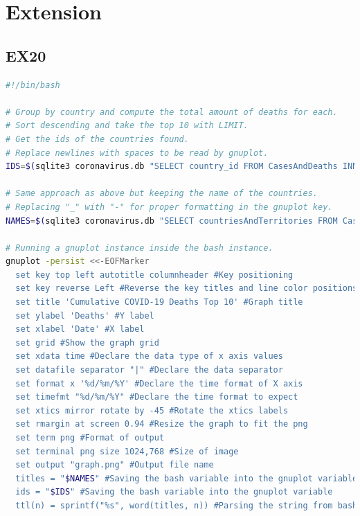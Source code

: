 \documentclass[12pt,oneside,a4paper,english]{article}
\begin{document}
\pagebreak
\section{Extension}
\subsection{EX20}

\begin{lstlisting}[language=Bash]
#!/bin/bash

# Group by country and compute the total amount of deaths for each.
# Sort descending and take the top 10 with LIMIT.
# Get the ids of the countries found.
# Replace newlines with spaces to be read by gnuplot.
IDS=$(sqlite3 coronavirus.db "SELECT country_id FROM CasesAndDeaths INNER JOIN Countries ON country_id=Countries.id GROUP BY country_id ORDER BY SUM(deaths) DESC LIMIT 10;" | tr '\n' ' ')

# Same approach as above but keeping the name of the countries.
# Replacing "_" with "-" for proper formatting in the gnuplot key.
NAMES=$(sqlite3 coronavirus.db "SELECT countriesAndTerritories FROM CasesAndDeaths INNER JOIN Countries ON country_id=Countries.id GROUP BY country_id ORDER BY SUM(deaths) DESC LIMIT 10;" | tr '\n' ' ' |  tr '_' '-')

# Running a gnuplot instance inside the bash instance.
gnuplot -persist <<-EOFMarker
  set key top left autotitle columnheader #Key positioning
  set key reverse Left #Reverse the key titles and line color positions in key
  set title 'Cumulative COVID-19 Deaths Top 10' #Graph title
  set ylabel 'Deaths' #Y label
  set xlabel 'Date' #X label
  set grid #Show the graph grid
  set xdata time #Declare the data type of x axis values
  set datafile separator "|" #Declare the data separator
  set format x '%d/%m/%Y' #Declare the time format of X axis
  set timefmt "%d/%m/%Y" #Declare the time format to expect
  set xtics mirror rotate by -45 #Rotate the xtics labels
  set rmargin at screen 0.94 #Resize the graph to fit the png
  set term png #Format of output
  set terminal png size 1024,768 #Size of image
  set output "graph.png" #Output file name
  titles = "$NAMES" #Saving the bash variable into the gnuplot variable
  ids = "$IDS" #Saving the bash variable into the gnuplot variable
  ttl(n) = sprintf("%s", word(titles, n)) #Parsing the string from bash to a gnuplot array
\end{lstlisting}
\end{document}
